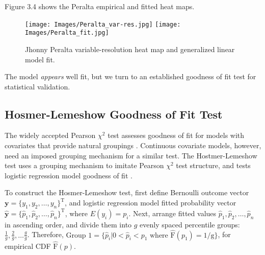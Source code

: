 Figure 3.4 shows the Peralta empirical and fitted heat maps.
  \begin{figure}[!ht]
    \centering
    \texttt{[image: Images/Peralta\_var-res.jpg]}
    \texttt{[image: Images/Peralta\_fit.jpg]}
    \caption{Jhonny Peralta variable-resolution heat map and generalized linear model fit.}
  \end{figure}
The model {\it appears} well fit, but we turn to an established goodness of fit test for statistical validation.

\subsection{Hosmer-Lemeshow Goodness of Fit Test} %

The widely accepted Pearson $\chi^{2}$ test assesses goodness of fit for models with covariates that provide natural groupings \citep{Pagano2000}. Continuous covariate models, however, need an imposed grouping mechanism for a similar test. The Hostmer-Lemeshow test uses a grouping mechanism to imitate Pearson $\chi^{2}$ test structure, and tests logistic regression model goodness of fit \citep{Hosmer2013}. 

To construct the Hosmer-Lemeshow test, first define Bernoulli outcome vector $\pmb{y} = \{y_{1}, y_{2}, \dots, y_{n}\}^{\text{T}}$, and logistic regression model fitted probability vector $\hat{\pmb{y}} = \{\hat{p}_{1}, \hat{p}_{2}, \dots, \hat{p}_{n}\}^{\text{T}}$, where $E(y_{i}) = p_{i}$. Next, arrange fitted values $\hat{p}_{1}, \hat{p}_{2}, \dots, \hat{p}_{n}$ in ascending order, and divide them into $g$ evenly spaced percentile groups: $\frac{1}{g}, \frac{2}{g}, \dots \frac{g}{g}$. Therefore, $\text{Group 1} = \{\hat{p}_{i}|0 < \hat{p}_{i} < p_{1} \text{ where } \hat{\text{F}}(p_{1})=1/\text{g} \}$, for empirical CDF $\hat{\text{F}}(p)$. 


